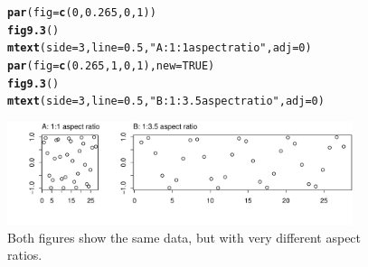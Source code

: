 \documentclass[12pt, a4paper,  BCOR=8.25mm, DIV=15]{scrartcl}\usepackage[]{graphicx}\usepackage[]{color}
\makeatletter
\newcommand{\hlnum}[1]{\textcolor[rgb]{0.686,0.059,0.569}{#1}}%
\newcommand{\hlstr}[1]{\textcolor[rgb]{0.192,0.494,0.8}{#1}}%
\newcommand{\hlstd}[1]{\textcolor[rgb]{0.345,0.345,0.345}{#1}}%
\newcommand{\hlkwc}[1]{\textcolor[rgb]{0.333,0.667,0.333}{#1}}%
\newcommand{\hlkwd}[1]{\textcolor[rgb]{0.737,0.353,0.396}{\textbf{#1}}}%
\newenvironment{kframe}{%
 \def\at@end@of@kframe{}%
 \ifinner\ifhmode%
  \def\at@end@of@kframe{\end{minipage}}%
  \begin{minipage}{\columnwidth}%
 \fi\fi%
 \def\FrameCommand##1{\hskip\@totalleftmargin \hskip-\fboxsep
 \colorbox{shadecolor}{##1}\hskip-\fboxsep
     \hskip-\linewidth \hskip-\@totalleftmargin \hskip\columnwidth}%
 \MakeFramed {\advance\hsize-\width
   \@totalleftmargin\z@ \linewidth\hsize
   \@setminipage}}%
 {\par\unskip\endMakeFramed%
 \at@end@of@kframe}
\newenvironment{knitrout}{}{} %
\makeatother
\begin{document}
\begin{figure}[ht]
\begin{knitrout}
\color{fgcolor}\begin{kframe}
\begin{alltt}
\hlkwd{par}\hlstd{(}\hlkwc{fig}\hlstd{=}\hlkwd{c}\hlstd{(}\hlnum{0}\hlstd{,}\hlnum{0.265}\hlstd{,} \hlnum{0}\hlstd{,}\hlnum{1}\hlstd{))}
\hlkwd{fig9.3}\hlstd{()}
\hlkwd{mtext}\hlstd{(}\hlkwc{side}\hlstd{=}\hlnum{3}\hlstd{,} \hlkwc{line}\hlstd{=}\hlnum{0.5}\hlstd{,} \hlstr{"A: 1:1 aspect ratio"}\hlstd{,} \hlkwc{adj}\hlstd{=}\hlnum{0}\hlstd{)}
\hlkwd{par}\hlstd{(}\hlkwc{fig}\hlstd{=}\hlkwd{c}\hlstd{(}\hlnum{0.265}\hlstd{,} \hlnum{1}\hlstd{,} \hlnum{0}\hlstd{,}\hlnum{1}\hlstd{),} \hlkwc{new}\hlstd{=}\hlnum{TRUE}\hlstd{)}
\hlkwd{fig9.3}\hlstd{()}
\hlkwd{mtext}\hlstd{(}\hlkwc{side}\hlstd{=}\hlnum{3}\hlstd{,} \hlkwc{line}\hlstd{=}\hlnum{0.5}\hlstd{,} \hlstr{"B: 1:3.5 aspect ratio"}\hlstd{,} \hlkwc{adj}\hlstd{=}\hlnum{0}\hlstd{)}
\end{alltt}
\end{kframe}

{\centering \includegraphics[width=0.9\textwidth]{figs/gph-fig9_3e-1} 

}



\end{knitrout}
\caption{Both figures show the same data, but with very different
  aspect ratios.\label{fig:aspect}}
\end{figure}
\end{document}
